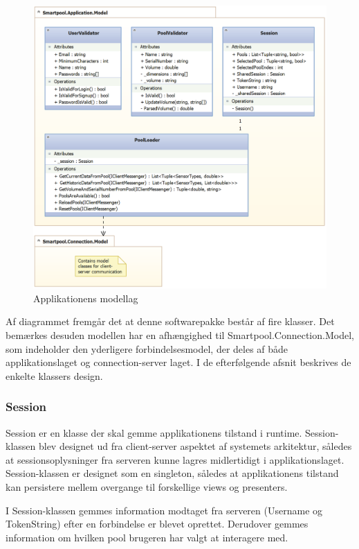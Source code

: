 \begin{figure}
	\centering
	\includegraphics[width=1.0\linewidth]{figs/design/application_model_cd}
	\caption{Applikationens modellag}
	\label{fig:application_model_cd}
\end{figure}

Af diagrammet fremgår det at denne softwarepakke består af fire klasser. Det bemærkes desuden modellen har en afhængighed til Smartpool.Connection.Model, som indeholder den yderligere forbindelsesmodel, der deles af både applikationslaget og connection-server laget. I de efterfølgende afsnit beskrives de enkelte klassers design.

\subsubsection{Session}

Session er en klasse der skal gemme applikationens tilstand i runtime. Session-klassen blev designet ud fra client-server aspektet af systemets arkitektur, således at sessionsoplysninger fra serveren kunne lagres midlertidigt i applikationslaget. Session-klassen er designet som en singleton, således at applikationens tilstand kan persistere mellem overgange til forskellige views og presenters.

I Session-klassen gemmes information modtaget fra serveren (Username og TokenString) efter en forbindelse er blevet oprettet. Derudover gemmes information om hvilken pool brugeren har valgt at interagere med.


